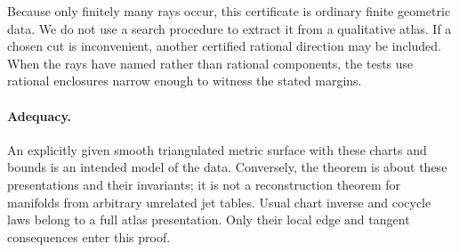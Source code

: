 Because only finitely many rays occur, this certificate is ordinary finite geometric data. We do not use a search procedure to extract it from a qualitative atlas. If a chosen cut is inconvenient, another certified rational direction may be included. When the rays have named rather than rational components, the tests use rational enclosures narrow enough to witness the stated margins.

\paragraph{Adequacy.}
An explicitly given smooth triangulated metric surface with these charts and bounds is an intended model of the data. Conversely, the theorem is about these presentations and their invariants; it is not a reconstruction theorem for manifolds from arbitrary unrelated jet tables. Usual chart inverse and cocycle laws belong to a full atlas presentation. Only their local edge and tangent consequences enter this proof.
